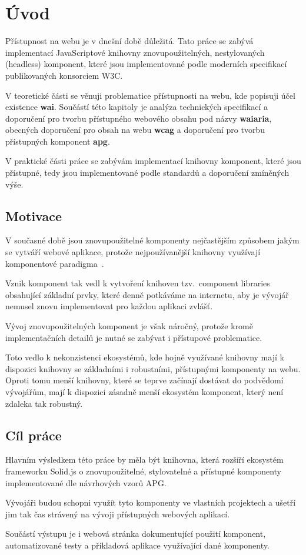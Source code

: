 \chapter{Úvod}

Přístupnost na webu je v dnešní době důležitá. Tato práce se zabývá implementací JavaScriptové knihovny
znovupoužitelných, nestylovaných (headless) komponent, které jsou implementované podle moderních specifikací publikovaných konsorciem W3C.

V teoretické části se věnuji problematice přístupnosti na webu, kde popisuji účel existence \textbf{\gls{wai}}.
Součástí této kapitoly je analýza technických specifikací a doporučení pro tvorbu přístupného webového obsahu
pod názvy \textbf{\gls{waiaria}}, obecných doporučení pro obsah na webu \textbf{\gls{wcag}} a doporučení pro tvorbu přístupných komponent \textbf{\gls{apg}}.

V praktické části práce se zabývám implementací knihovny komponent,
které jsou přístupné, tedy jsou implementované podle standardů a doporučení zmíněných výše.

\section{Motivace}

V současné době jsou znovupoužitelné komponenty nejčastějším způsobem jakým se vytváří webové aplikace, protože nejpoužívanější knihovny využívají komponentové paradigma~\cite{react,vue,solid,svelte}.

Vznik komponent tak vedl k vytvoření knihoven tzv.\ component libraries obsahující základní prvky, které denně potkáváme na internetu, aby je vývojář nemusel znovu implementovat pro každou aplikaci zvlášť.

Vývoj znovupoužitelných komponent je však náročný, protože kromě implementačních detailů je nutné se zabývat i přístupové problematice.

Toto vedlo k nekonzistenci ekosystémů, kde hojně využívané knihovny mají k dispozici knihovny se základními i robustními, přístupnými komponenty na webu. Oproti tomu menší knihovny, které se teprve začínají dostávat do podvědomí vývojářům, mají k dispozici zásadně menší ekosystém komponent, který není zdaleka tak robustný.

\section{Cíl práce}

Hlavním výsledkem této práce by měla být knihovna, která rozšíří ekosystém frameworku Solid.js o znovupoužitelné, stylovatelné a přístupné komponenty implementované dle návrhových vzorů APG.

Vývojáři budou schopni využít tyto komponenty ve vlastních projektech a ušetří jim tak čas strávený na vývoji přístupných webových aplikací.

Součástí výstupu je i webová stránka dokumentující použití komponent, automatizované testy a příkladová aplikace využívající dané komponenty.
